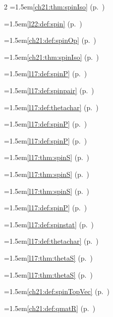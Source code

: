 \begin{multicols}{2}
\hangindent=1.5em\quad \ref{ch21:thm:spinIso} (p.~\pageref{ch21:thm:spinIso})\par
\hangindent=1.5em\quad \ref{l22:def:spin} (p.~\pageref{l22:def:spin})\par
\hangindent=1.5em\quad \ref{ch21:def:spinOp} (p.~\pageref{ch21:def:spinOp})\par
\hangindent=1.5em\quad \ref{ch21:thm:spinIso} (p.~\pageref{ch21:thm:spinIso})\par
\hangindent=1.5em\quad \ref{l17:def:spinP} (p.~\pageref{l17:def:spinP})\par
\hangindent=1.5em\quad \ref{l17:def:spinpair} (p.~\pageref{l17:def:spinpair})\par
\hangindent=1.5em\quad \ref{l17:def:thetachar} (p.~\pageref{l17:def:thetachar})\par
\hangindent=1.5em\quad \ref{l17:def:spinP} (p.~\pageref{l17:def:spinP})\par
\hangindent=1.5em\quad \ref{l17:def:spinP} (p.~\pageref{l17:def:spinP})\par
\hangindent=1.5em\quad \ref{l17:thm:spinS} (p.~\pageref{l17:thm:spinS})\par
\hangindent=1.5em\quad \ref{l17:thm:spinS} (p.~\pageref{l17:thm:spinS})\par
\hangindent=1.5em\quad \ref{l17:thm:spinS} (p.~\pageref{l17:thm:spinS})\par
\hangindent=1.5em\quad \ref{l17:def:spinP} (p.~\pageref{l17:def:spinP})\par
\hangindent=1.5em\quad \ref{l17:def:spinstat} (p.~\pageref{l17:def:spinstat})\par
\hangindent=1.5em\quad \ref{l17:def:thetachar} (p.~\pageref{l17:def:thetachar})\par
\hangindent=1.5em\quad \ref{l17:thm:thetaS} (p.~\pageref{l17:thm:thetaS})\par
\hangindent=1.5em\quad \ref{l17:thm:thetaS} (p.~\pageref{l17:thm:thetaS})\par
\hangindent=1.5em\quad \ref{ch21:def:spinTopVec} (p.~\pageref{ch21:def:spinTopVec})\par
\hangindent=1.5em\quad \ref{ch21:def:qmatR} (p.~\pageref{ch21:def:qmatR})\par

\end{multicols}
